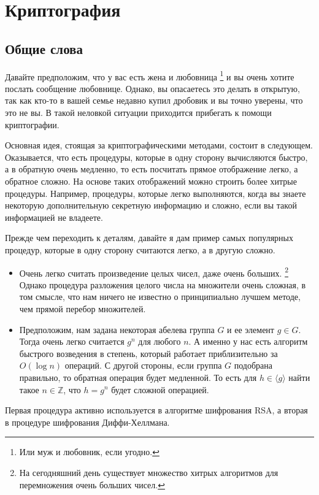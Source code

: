 \section{Криптография}

\subsection{Общие слова}

Давайте предположим, что у вас есть жена и любовница%
\footnote{Или муж и любовник, если угодно.}
и вы очень хотите послать сообщение любовнице. Однако, вы опасаетесь это делать в открытую, так как кто-то в вашей семье недавно купил дробовик и вы точно уверены, что это не вы. В такой неловкой ситуации приходится прибегать к помощи криптографии.

Основная идея, стоящая за криптографическими методами, состоит в следующем. Оказывается, что есть процедуры, которые в одну сторону вычисляются быстро, а в обратную очень медленно, то есть посчитать прямое отображение легко, а обратное сложно. На основе таких отображений можно строить более хитрые процедуры. Например, процедуры, которые легко выполняются, когда вы знаете некоторую дополнительную секретную информацию и сложно, если вы такой информацией не владеете.

Прежде чем переходить к деталям, давайте я дам пример самых популярных процедур, которые в одну сторону считаются легко, а в другую сложно.
\begin{itemize}
\item Очень легко считать произведение целых чисел, даже очень больших.%
\footnote{На сегодняшний день существует множество хитрых алгоритмов для перемножения очень больших чисел.}
Однако процедура разложения целого числа на множители очень сложная, в том смысле, что нам ничего не известно о принципиально лучшем методе, чем прямой перебор множителей.

\item  Предположим, нам задана некоторая абелева группа $G$ и ее элемент $g\in G$. Тогда очень легко считается $g^n$ для любого $n$. А именно у нас есть алгоритм быстрого возведения в степень, который работает приблизительно за $O(\log n)$ операций. С другой стороны, если группа $G$ подобрана правильно, то обратная операция будет медленной. То есть для $h\in \langle g \rangle$ найти такое $n\in \mathbb Z$, что $h = g^n$ будет сложной операцией.
\end{itemize}
Первая процедура активно используется в алгоритме шифрования RSA, а вторая в процедуре шифрования Диффи-Хеллмана.

